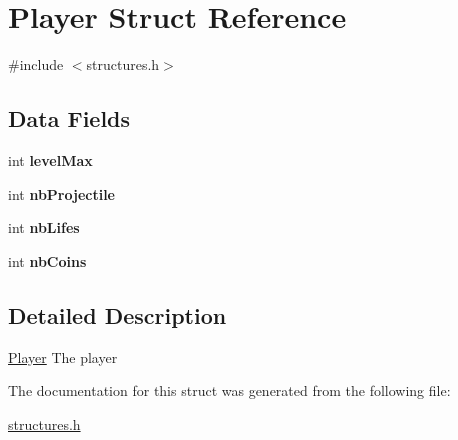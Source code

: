 \hypertarget{struct_player}{\section{Player Struct Reference}
\label{struct_player}
}


{\ttfamily \#include $<$structures.\-h$>$}

\subsection*{Data Fields}
\begin{DoxyCompactItemize}
\item 
\hypertarget{struct_player_a239aaece8decb78587f72db6166743ca}{int {\bfseries level\-Max}}\label{struct_player_a239aaece8decb78587f72db6166743ca}

\item 
\hypertarget{struct_player_a803fd7edf0558a9e0dc73e6351ad85d0}{int {\bfseries nb\-Projectile}}\label{struct_player_a803fd7edf0558a9e0dc73e6351ad85d0}

\item 
\hypertarget{struct_player_ae4069fd5e08497b888237e5eb9f2e4ad}{int {\bfseries nb\-Lifes}}\label{struct_player_ae4069fd5e08497b888237e5eb9f2e4ad}

\item 
\hypertarget{struct_player_a90f72e24f08427f541b92bfc5a7982d3}{int {\bfseries nb\-Coins}}\label{struct_player_a90f72e24f08427f541b92bfc5a7982d3}

\end{DoxyCompactItemize}


\subsection{Detailed Description}
\hyperlink{struct_player}{Player} The player 

The documentation for this struct was generated from the following file\-:\begin{DoxyCompactItemize}
\item 
\hyperlink{structures_8h}{structures.\-h}\end{DoxyCompactItemize}
